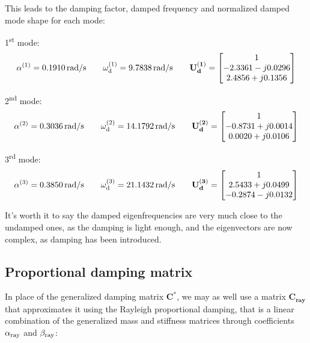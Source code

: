 \documentclass[a4paper,12pt,oneside]{article}
\begin{document}
\clearpage

This leads to the damping factor, damped frequency and normalized damped mode shape for each mode:

\vspace{10pt}

1\textsuperscript{st} mode:
\[
	\alpha^{(1)} = 0.1910 \, \text{rad/s} \hspace{20pt}
		\omega_\textup{d}^{(1)} = 9.7838 \, \text{rad/s} \hspace{20pt}
		\mathbf{U_d^{(1)}} =	\begin{bmatrix}
													1 \\
													-2.3361 - j0.0296 \\
													2.4856 + j0.1356
												\end{bmatrix}
\]

2\textsuperscript{nd} mode:
\[
	\alpha^{(2)} = 0.3036 \, \text{rad/s} \hspace{20pt}
		\omega_\textup{d}^{(2)} = 14.1792 \, \text{rad/s} \hspace{20pt}
		\mathbf{U_d^{(2)}} =	\begin{bmatrix}
													1 \\
													-0.8731 + j0.0014 \\
													0.0020 + j0.0106
												\end{bmatrix}
\]

3\textsuperscript{rd} mode:
\[
	\alpha^{(3)} = 0.3850 \, \text{rad/s} \hspace{20pt}
		\omega_\textup{d}^{(3)} = 21.1432 \, \text{rad/s} \hspace{20pt}
		\mathbf{U_d^{(3)}} =	\begin{bmatrix}
													1 \\
													2.5433 + j0.0499 \\
													-0.2874 -j0.0132
												\end{bmatrix}
\]

It's worth it to say the damped eigenfrequencies are very much close to the undamped ones, as the damping is light enough, and the eigenvectors are now complex, as damping has been introduced.

\subsection{Proportional damping matrix}
\label{subs:rayleigh_damping}

In place of the generalized damping matrix $ \mathbf{C^*} $, we may as well use a matrix $ \mathbf{C_{ray}} $ that approximates it using the Rayleigh proportional damping, that is a linear combination of the generalized mass and stiffness matrices through coefficients $ \alpha_\textup{ray} $ and $ \beta_\textup{ray} $:
\end{document}
